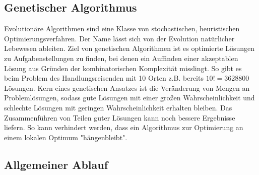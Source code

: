 \documentclass[11pt]{article}
\begin{document}
    \subsection{Genetischer Algorithmus}
    Evolutionäre Algorithmen sind eine Klasse von stochastischen, heuristischen
    Optimierungsverfahren. Der Name lässt sich von der Evolution natürlicher Lebewesen ableiten.
    Ziel von genetischen Algorithmen ist es optimierte Lösungen zu Aufgabenstellungen zu finden,
    bei denen ein Auffinden einer akzeptablen Lösung aus Gründen der kombinatorischen Komplexität
    misslingt. So gibt es beim Problem des Handlungsreisenden mit 10 Orten z.B. bereits
    $10!=3628800$ Lösungen. Kern eines genetischen Ansatzes ist die Veränderung von Mengen an
    Problemlösungen, sodass gute Lösungen mit einer großen Wahrscheinlichkeit und schlechte
    Lösungen mit geringen Wahrscheinlichkeit erhalten bleiben. Das Zusammenführen von Teilen guter
    Lösungen kann noch bessere Ergebnisse liefern. So kann verhindert werden, dass ein
    Algorithmus zur Optimierung an einem lokalen Optimum "hängenbleibt".

    \newpage

    \subsection{Allgemeiner Ablauf}
    \\~~\\
    \begin{center}
    \end{center}
\end{document}
